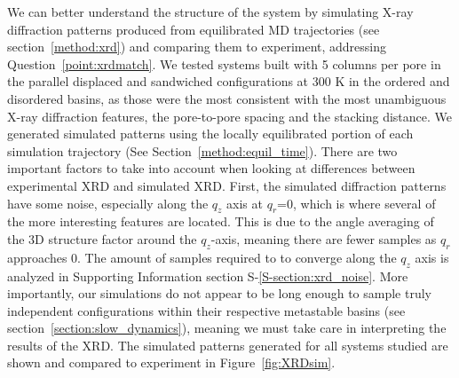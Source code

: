 \documentclass[journal=jpcbfk,manuscript=article]{achemso}
\begin{document}
  We can better understand the structure of the system by simulating X-ray
  diffraction patterns produced from equilibrated MD trajectories (see
  section~\ref{method:xrd}) and comparing them to experiment, addressing
  Question~\ref{point:xrdmatch}. We tested systems built with 5 columns per pore
  in the parallel displaced and sandwiched configurations at
  300 K in the ordered and disordered basins, as those were the most consistent
  with the most unambiguous X-ray diffraction features, the pore-to-pore spacing
  and the stacking distance.  We generated simulated patterns using the locally
  equilibrated portion of each simulation trajectory (See
  Section~\ref{method:equil_time}). There are two important factors to take into
  account when looking at differences between experimental XRD and simulated XRD.
  First, the simulated diffraction patterns have some noise, especially along the
  $q_z$ axis at $q_r$=0, which is where several of the more interesting features
  are located. This is due to the angle averaging of the 3D structure factor
  around the $q_z$-axis, meaning there are fewer samples as  $q_r$ approaches 0.
  The amount of samples required to to converge along the $q_z$ axis is analyzed
  in Supporting Information section S-\ref{S-section:xrd_noise}.  More
  importantly, our simulations do not appear to be long enough to sample truly
  independent configurations within their respective metastable basins (see
  section~\ref{section:slow_dynamics}), meaning we must take care in interpreting
  the results of the XRD. The simulated patterns generated for all systems
  studied are shown and compared to experiment in Figure~\ref{fig:XRDsim}.
\end{document}
